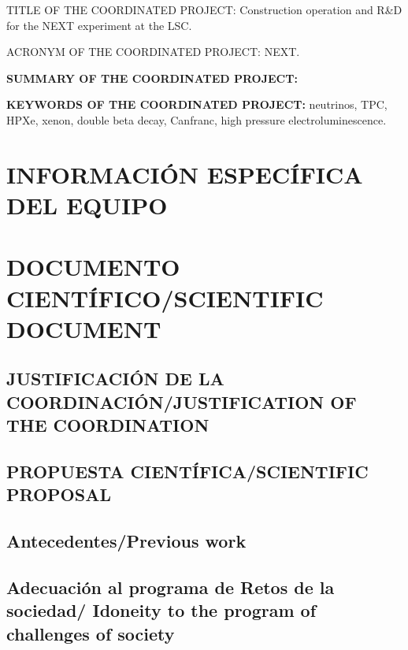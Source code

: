 \documentclass[a4paper,11pt,oneside]{article}
\begin{document}
 \vspace{0.6cm}
{\sc TITLE OF THE COORDINATED PROJECT:} Construction operation and R\&D for the NEXT experiment at the LSC. 
\vspace{0.3cm}

{\sc ACRONYM OF THE COORDINATED PROJECT:} NEXT.
\vspace{0.3cm}

{\bf SUMMARY OF THE COORDINATED PROJECT:} 
\vspace{0.3cm}



 \vspace{0.3cm}

{\bf KEYWORDS OF THE COORDINATED PROJECT:} neutrinos, TPC, HPXe, xenon, double beta decay, Canfranc, high pressure electroluminescence. 

\section{INFORMACIÓN ESPECÍFICA DEL EQUIPO}
\newpage

\section{\bf DOCUMENTO CIENTÍFICO/SCIENTIFIC DOCUMENT}

\subsection{\sc JUSTIFICACIÓN DE LA COORDINACIÓN/JUSTIFICATION OF THE COORDINATION}
\vspace{0.3cm}



\subsection{\bf PROPUESTA CIENTÍFICA/SCIENTIFIC PROPOSAL}



\subsection*{\sc Antecedentes/Previous work}



\subsection*{\sc Adecuación al programa de Retos de la sociedad/ Idoneity to the program of challenges of society  }
\end{document}
